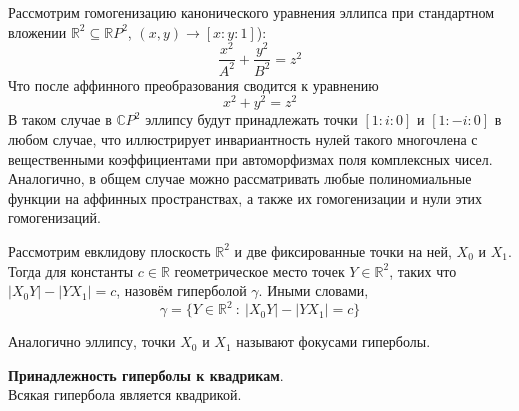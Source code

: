 \documentclass[11pt]{report}
\begin{document}
    \vspace{10pt}

    Рассмотрим гомогенизацию канонического уравнения эллипса при стандартном вложении $\mathbb{R}^2 \subseteq \mathbb{R}P^2$, $(x, y) \to [x:y:1]$):
    \begin{equation*}
        \dfrac{x^2}{A^2} + \dfrac{y^2}{B^2} = z^2
    \end{equation*}
    Что после аффинного преобразования сводится к уравнению
    \begin{equation*}
        x^2 + y^2 = z^2
    \end{equation*}
    В таком случае в $\mathbb{C}P^2$ эллипсу будут принадлежать точки $[1:i:0]$ и $[1:-i:0]$ в любом случае, что иллюстрирует инвариантность нулей такого многочлена с вещественными коэффициентами при автоморфизмах поля комплексных чисел. \\
    Аналогично, в общем случае можно рассматривать любые полиномиальные функции на аффинных пространствах, а также их гомогенизации и нули этих гомогенизаций.

    \begin{definition}
    Рассмотрим евклидову плоскость $\mathbb{R}^2$ и две фиксированные точки на ней, $X_0$ и $X_1$. Тогда для константы $c \in \mathbb{R}$ геометрическое место точек $Y \in \mathbb{R}^2$, таких что $|X_0Y| - |YX_1| = c$, назовём гиперболой $\gamma$. Иными словами,
    \begin{equation*}
        \gamma = \{Y \in \mathbb{R}^2 \ :\ |X_0Y| - |YX_1| = c\}
    \end{equation*}
    \end{definition}

    \begin{remark}
    Аналогично эллипсу, точки $X_0$ и $X_1$ называют фокусами гиперболы.
    \end{remark}

    \begin{lemma}
    \textbf{Принадлежность гиперболы к квадрикам}.\\ Всякая гипербола является квадрикой.
    \end{lemma}
\end{document}
